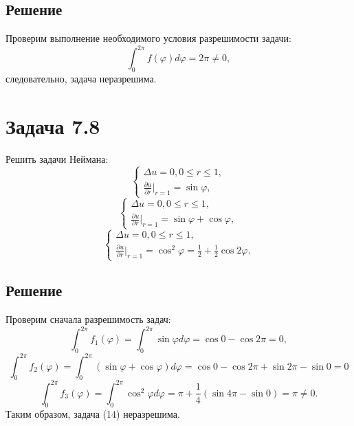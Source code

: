 \documentclass[11pt]{article}
\begin{document}
\subsection{Решение}
\label{sec:org6d6ce73}
Проверим выполнение необходимого условия разрешимости задачи:
\begin{equation*}
\int_0^{2\pi}f(\varphi)d\varphi = 2\pi \neq 0,
\end{equation*}
следовательно, задача неразрешима.
\section{Задача 7.8}
\label{sec:orged777aa}
Решить задачи Неймана:
\begin{equation}
\begin{cases}
\Delta u = 0, 0 \leq r \leq 1, \\
\frac{\partial u}{\partial r}\bigg|_{r = 1} = \sin\varphi,
\end{cases}
\end{equation}
\begin{equation}
\begin{cases}
\Delta u = 0, 0 \leq r \leq 1, \\
\frac{\partial u}{\partial r}\bigg|_{r = 1} = \sin\varphi + \cos\varphi,
\end{cases}
\end{equation}
\begin{equation}
\begin{cases}
\Delta u = 0, 0 \leq r \leq 1, \\
\frac{\partial u}{\partial r}\bigg|_{r = 1} = \cos^2\varphi = \frac12 + \frac12\cos2\varphi.
\end{cases}
\end{equation}
\subsection{Решение}
\label{sec:org9d408cf}
Проверим сначала разрешимость задач:
\begin{equation*}
\int_0^{2\pi}f_1(\varphi) = \int_0^{2\pi}\sin\varphi d\varphi = \cos0 - \cos2\pi = 0,
\end{equation*}
\begin{equation*}
\int_0^{2\pi}f_2(\varphi) = \int_0^{2\pi}(\sin\varphi + \cos\varphi)d\varphi =
\cos0 - \cos2\pi + \sin2\pi - \sin0 = 0
\end{equation*}
\begin{equation*}
\int_0^{2\pi}f_3(\varphi) = \int_0^{2\pi}\cos^2\varphi d\varphi = \pi + \frac14(\sin4\pi - \sin0) = \pi \neq 0.
\end{equation*}
Таким образом, задача (14) неразрешима.
\end{document}
